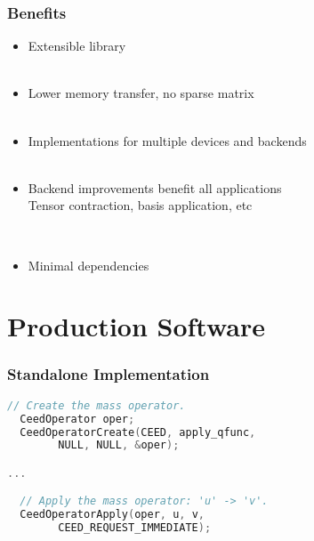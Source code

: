 \documentclass{beamer}
\begin{document}
\begin{frame}
\begin{center}
\frametitle{Benefits}

\begin{itemize}

\item Extensible library\\

~\\

\item Lower memory transfer, no sparse matrix\\

~\\

\item Implementations for multiple devices and backends\\

~\\

\item Backend improvements benefit all applications\\

\hspace{6mm} Tensor contraction, basis application, etc

~\\

\item Minimal dependencies\\

\end{itemize}

\end{center}
\end{frame}

\section{Production Software}

\begin{frame}[fragile]
\begin{center}
\frametitle{Standalone Implementation}

\begin{lstlisting}[language=C]
  // Create the mass operator.
  CeedOperator oper;
  CeedOperatorCreate(CEED, apply_qfunc,
		NULL, NULL, &oper);

...

  // Apply the mass operator: 'u' -> 'v'.
  CeedOperatorApply(oper, u, v, 
		CEED_REQUEST_IMMEDIATE);
\end{lstlisting}

\end{center}
\end{frame}
\end{document}
